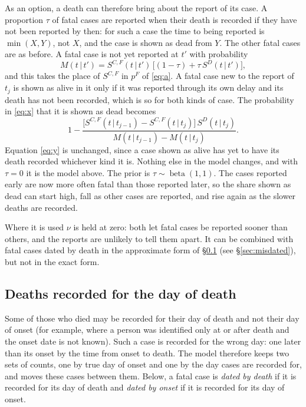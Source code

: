 \documentclass[11pt,a4paper]{article}
\newcommand{\given}{\,|\,}
\newcommand{\betad}{\operatorname{beta}}
\begin{document}
As an option, a death can therefore bring about the report of its case. A
proportion $\tau$ of fatal cases are reported when their death is recorded
if they have not been reported by then: for such a case the time to being
reported is $\min(X,Y)$, not $X$, and the case is shown as dead from $Y$.
The other fatal cases are as before. A fatal case is not yet reported at
$t'$ with probability
\[
M(t\given t')=S^{C,F}(t\given t')\,\bigl[(1-\tau)+\tau\,S^{D}(t\given t')\bigr],
\]
and this takes the place of $S^{C,F}$ in $p^{F}$ of \eqref{eq:a}. A fatal
case new to the report of $t_j$ is shown as alive in it only if it was
reported through its own delay and its death has not been recorded, which
is so for both kinds of case. The probability in \eqref{eq:x} that it is
shown as dead becomes
\[
1-\frac{\bigl[S^{C,F}(t\given t_{j-1})-S^{C,F}(t\given t_j)\bigr]\,S^{D}(t\given t_j)}
       {M(t\given t_{j-1})-M(t\given t_j)}.
\]
Equation \eqref{eq:y} is unchanged, since a case shown as alive has yet to
have its death recorded whichever kind it is. Nothing else in the model
changes, and with $\tau=0$ it is the model above. The prior is
$\tau\sim\betad(1,1)$. The cases reported early are now more often fatal
than those reported later, so the share shown as dead can start high, fall
as other cases are reported, and rise again as the slower deaths are
recorded.

Where it is used $\nu$ is held at zero: both let fatal cases be reported
sooner than others, and the reports are unlikely to tell them apart. It can
be combined with fatal cases dated by death in the approximate form of
\S\ref{sec:dated} (see \S\ref{sec:misdated}), but not in the exact form.

\subsection{Deaths recorded for the day of death}\label{sec:dated}

Some of those who died may be recorded for their day of death and not their
day of onset (for example, where a person was identified only at or after
death and the onset date is not known). Such a case is recorded for the
wrong day: one later than its onset by the time from onset to death. The
model therefore keeps two sets of counts, one by true day of onset and one
by the day cases are recorded for, and moves these cases between them.
Below, a fatal case is \emph{dated by death} if it is recorded for its day
of death and \emph{dated by onset} if it is recorded for its day of onset.
\end{document}
